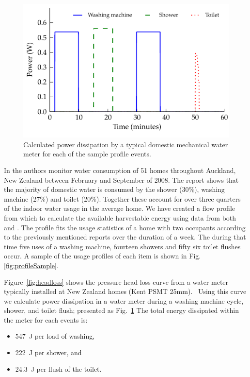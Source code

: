 \documentclass[10pt,final,journal]{IEEEtran}
\begin{document}
    \begin{figure}
        \begin{center}
        \includegraphics[width=\linewidth]{graph_harvest}
        \end{center}
        \caption{Calculated power dissipation by a typical domestic mechanical water meter for each of the sample profile events.}
        \label{fig:powerDissipated_meter}
    \end{figure}


    In \cite{Heinrich2008} the authors monitor water consumption of 51 homes throughout Auckland, New Zealand between February and September of 2008.
    The report shows that the majority of domestic water is consumed by the shower (30\%), washing machine (27\%) and toilet (20\%).
    Together these account for over three quarters of the indoor water usage in the average home.
    We have created a flow profile from which to calculate the available harvestable energy using data from both \cite{Heinrich2008} and \cite{Heinrich2007}.
    The profile fits the usage statistics of a home with two occupants according to the previously mentioned reports over the duration of a week.
    The during that time five uses of a washing machine, fourteen showers and fifty six toilet flushes occur.
    A sample of the usage profiles of each item is shown in Fig. \ref{fig:profileSample}.

    Figure~\ref{fig:headloss} shows the pressure head loss curve from a water meter typically installed at New Zealand homes (Kent PSMT 25mm).~\cite{WatercareNewZealand2014}
    Using this curve we calculate power dissipation in a water meter during a washing machine cycle, shower, and toilet flush; presented as Fig.~\ref{fig:powerDissipated_meter}
    The total energy dissipated within the meter for each events is:
    \begin{itemize}
    \item \SI{547}{\joule} per load of washing,
    \item \SI{222}{\joule} per shower, and
    \item \SI{24.3}{\joule} per flush of the toilet.
    \end{itemize}
\end{document}
